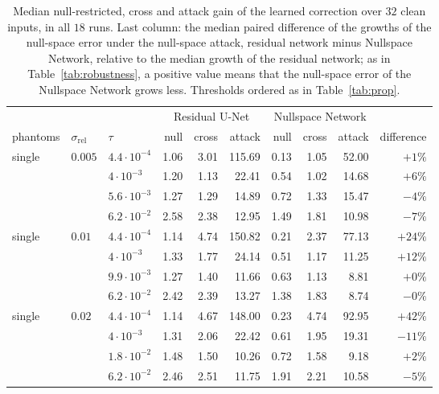 \documentclass{article}
\numberwithin{equation}{section}
\begin{document}
\begin{table}[htbp]
\centering
\caption{Median null-restricted, cross and attack gain of the learned correction over $32$ clean
inputs, in all $18$ runs. Last column: the median paired difference of the growths of the null-space error
under the null-space attack, residual network minus Nullspace Network, relative to the median growth of the
residual network; as in Table~\ref{tab:robustness}, a positive value means that the null-space error of the
Nullspace Network grows less. Thresholds ordered as in Table~\ref{tab:prop}.}\label{tab:gains}
\small\setlength{\tabcolsep}{3.5pt}
\begin{tabular}{l l l rrr rrr r}
\toprule
 & & & \multicolumn{3}{c}{Residual U-Net} & \multicolumn{3}{c}{Nullspace Network} & \\
\cmidrule(lr){4-6}\cmidrule(lr){7-9}
phantoms & $\sigma_\text{rel}$ & $\tau$ & null & cross & attack & null & cross & attack & difference \\
\midrule
single & $0.005$  & $4.4\cdot10^{-4}$ & 1.06 & 3.01 & 115.69 & 0.13 & 1.05 & 52.00 & $+1\%$ \\
       &          & $4\cdot10^{-3}$   & 1.20 & 1.13 & 22.41 & 0.54 & 1.02 & 14.68 & $+6\%$ \\
       &          & $5.6\cdot10^{-3}$ & 1.27 & 1.29 & 14.89 & 0.72 & 1.33 & 15.47 & $-4\%$ \\
       &          & $6.2\cdot10^{-2}$ & 2.58 & 2.38 & 12.95 & 1.49 & 1.81 & 10.98 & $-7\%$ \\
\midrule
single & $0.01$   & $4.4\cdot10^{-4}$ & 1.14 & 4.74 & 150.82 & 0.21 & 2.37 & 77.13 & $+24\%$ \\
       &          & $4\cdot10^{-3}$   & 1.33 & 1.77 & 24.14 & 0.51 & 1.17 & 11.25 & $+12\%$ \\
       &          & $9.9\cdot10^{-3}$ & 1.27 & 1.40 & 11.66 & 0.63 & 1.13 & 8.81 & $+0\%$ \\
       &          & $6.2\cdot10^{-2}$ & 2.42 & 2.39 & 13.27 & 1.38 & 1.83 & 8.74 & $-0\%$ \\
\midrule
single & $0.02$   & $4.4\cdot10^{-4}$ & 1.14 & 4.67 & 148.00 & 0.23 & 4.74 & 92.95 & $+42\%$ \\
       &          & $4\cdot10^{-3}$   & 1.31 & 2.06 & 22.42 & 0.61 & 1.95 & 19.31 & $-11\%$ \\
       &          & $1.8\cdot10^{-2}$ & 1.48 & 1.50 & 10.26 & 0.72 & 1.58 & 9.18 & $+2\%$ \\
       &          & $6.2\cdot10^{-2}$ & 2.46 & 2.51 & 11.75 & 1.91 & 2.21 & 10.58 & $-5\%$ \\

\end{tabular}
\end{table}
\end{document}
